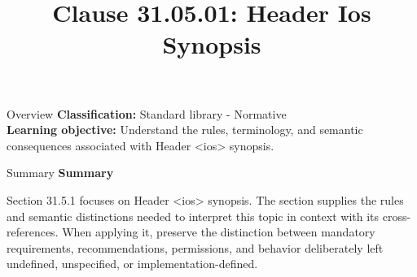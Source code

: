 \documentclass[10pt,letterpaper]{article}
\title{Clause 31.05.01: Header Ios Synopsis}
\author{}
\date{}
\begin{document}
\maketitle
\begin{CornellOverviewBox}{Overview}
\textbf{Classification:} Standard library - Normative\\[2pt]
\textbf{Learning objective:} Understand the rules, terminology, and semantic consequences associated with Header <ios> synopsis.
\end{CornellOverviewBox}\begin{CornellSummaryBox}{Summary}
{\sffamily\bfseries\color{Accent} Summary}\par\vspace{3pt}Section 31.5.1 focuses on Header <ios> synopsis. The section supplies the rules and semantic distinctions needed to interpret this topic in context with its cross-references. When applying it, preserve the distinction between mandatory requirements, recommendations, permissions, and behavior deliberately left undefined, unspecified, or implementation-defined.
\end{CornellSummaryBox}
\end{document}
